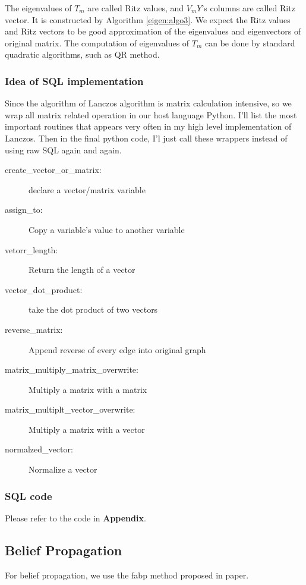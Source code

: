 The eigenvalues of $T_{m}$ are called Ritz values, and $V_{m}Y$'s columns are called Ritz vector. It is constructed by Algorithm \ref{eigen:algo3}. We expect the Ritz values and Ritz vectors to be good approximation of the eigenvalues and eigenvectors of original matrix. The computation of eigenvalues of $T_{m}$ can be done by standard quadratic algorithms, such as QR method. 


\subsubsection{Idea of SQL implementation}
Since the algorithm of Lanczos algorithm is matrix calculation intensive, so we wrap all matrix related operation in our host language Python. I'll list the most important routines that appears very often in my high level implementation of Lanczos. Then in the final python code, I'l just call these wrappers instead of using raw SQL again and again.
\begin{description}
  \item[create\_vector\_or\_matrix:]{declare a vector/matrix variable}
  \item[assign\_to:]{Copy a variable's value to another variable}
  \item[vetorr\_length:]{Return the length of a vector}
  \item[vector\_dot\_product:]{take the dot product of two vectors}
  \item[reverse\_matrix:]{Append reverse of every edge into original graph}
  \item[matrix\_multiply\_matrix\_overwrite:]{Multiply a matrix with a matrix}
  \item[matrix\_multiplt\_vector\_overwrite:]{Multiply a matrix with a vector}
  \item[normalzed\_vector:]{Normalize a vector}
\end{description}

\subsubsection{SQL code}
Please refer to the code in {\bf Appendix}.

\subsection{Belief Propagation}
For belief propagation, we use the fabp method proposed in paper\cite{DBLP:conf/pkdd/KoutraKKCPF11}.

